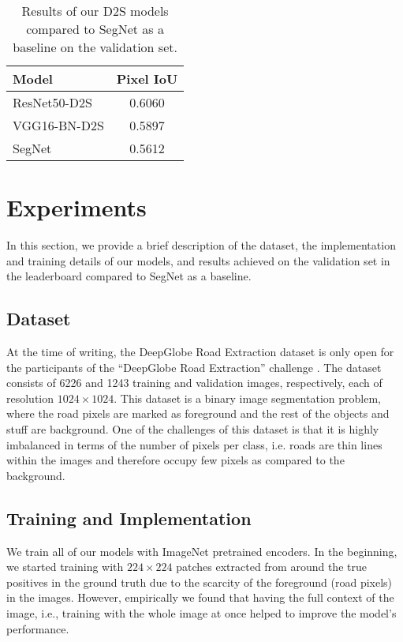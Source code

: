 \documentclass[10pt,twocolumn,letterpaper]{article}
\begin{document}


\begin{table}[t]
\centering
\caption{Results of our D2S models compared to SegNet as a baseline on the validation set.}
\label{tab:results}
\begin{tabular}{lc}
\hline
\textbf{Model} & \multicolumn{1}{l}{\textbf{Pixel IoU}} \\ \hline
ResNet50-D2S & 0.6060 \\ \hline
VGG16-BN-D2S & 0.5897 \\ \hline
SegNet \cite{segnet} & 0.5612 \\ \hline
\end{tabular}
\end{table}


\section{Experiments}

In this section, we provide a brief description of the dataset, the implementation and training details of our models, and results achieved on the validation set in the leaderboard compared to SegNet as a baseline.


\subsection{Dataset}

At the time of writing, the DeepGlobe Road Extraction dataset is only open for the participants of the ``DeepGlobe Road Extraction'' challenge \cite{deepglobe}. The dataset consists of 6226 and 1243 training and validation images, respectively, each of resolution $1024\times 1024$. This dataset is a binary image segmentation problem, where the road pixels are marked as foreground and the rest of the objects and stuff are background. One of the challenges of this dataset is that it is highly imbalanced in terms of the number of pixels per class, i.e. roads are thin lines within the images and therefore occupy few pixels as compared to the background.


\subsection{Training and Implementation}

We train all of our models with ImageNet \cite{imagenet-dataset} pretrained encoders. In the beginning, we started training with $224\times 224$ patches extracted from around the true positives in the ground truth due to the scarcity of the foreground (road pixels) in the images. However, empirically we found that having the full context of the image, i.e., training with the whole image at once helped to improve the model's performance.
\end{document}
